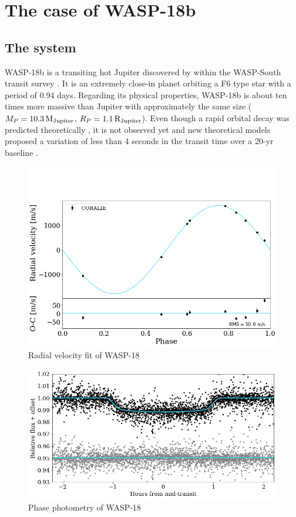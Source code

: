 \chapter{The case of WASP-18b}\label{chap:wasp18}

\section{The system}
WASP-18b is a transiting hot Jupiter discovered by \cite{Hellier2009} within the WASP-South transit survey \citep{Pollacco2006}. It is an extremely close-in planet orbiting a F6 type star with a period of 0.94 days. Regarding its physical properties, WASP-18b is about ten times more massive than Jupiter with approximately the same size ($M_{P}=10.3\,{\rm M_{Jupiter}}$, $R_{P}=1.1\,{\rm R_{Jupiter}}$). Even though a rapid orbital decay was predicted theoretically \citep{Hellier2009}, it is not observed yet \citep{Wilkins2017} and new theoretical models proposed a variation of less than 4 seconds in the transit time over a 20-yr baseline \citep{CollierCameron2018}. 


\begin{figure}
\centering
\includegraphics[width=0.7\columnwidth]{imagenes/W18_RV.png}
\caption{Radial velocity fit of WASP-18 }
\label{rv_wasp18}
\end{figure}

\begin{figure}
\centering
\includegraphics[width=0.7\columnwidth]{imagenes/W18_PHASE.png}
\caption{Phase photometry of WASP-18 }
\label{phase_wasp18}
\end{figure}

